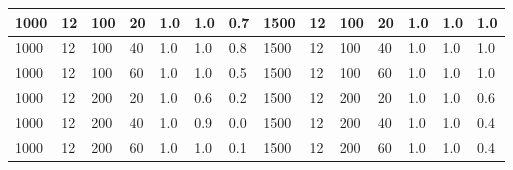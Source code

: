\begin{table}[H]
\begin{tabular}{|l|l|l|l|l|l|l|l|l|l|l|l|l|l|}
1000                    & 12                     & 100                    & 20                      & 1.0                       & 1.0                    & 0.7                     & 1500                   & 12                     & 100                    & 20                      & 1.0                       & 1.0                    & 1.0                     \\ \hline
1000                    & 12                     & 100                    & 40                      & 1.0                       & 1.0                    & 0.8                     & 1500                   & 12                     & 100                    & 40                      & 1.0                       & 1.0                    & 1.0                     \\ \hline
1000                    & 12                     & 100                    & 60                      & 1.0                       & 1.0                    & 0.5                     & 1500                   & 12                     & 100                    & 60                      & 1.0                       & 1.0                    & 1.0                     \\ \hline
1000                    & 12                     & 200                    & 20                      & 1.0                       & 0.6                    & 0.2                     & 1500                   & 12                     & 200                    & 20                      & 1.0                       & 1.0                    & 0.6                     \\ \hline
1000                    & 12                     & 200                    & 40                      & 1.0                       & 0.9                    & 0.0                     & 1500                   & 12                     & 200                    & 40                      & 1.0                       & 1.0                    & 0.4                     \\ \hline
1000                    & 12                     & 200                    & 60                      & 1.0                       & 1.0                    & 0.1                     & 1500                   & 12                     & 200                    & 60                      & 1.0                       & 1.0                    & 0.4                     \\ \hline
\end{tabular}
\end{table}
